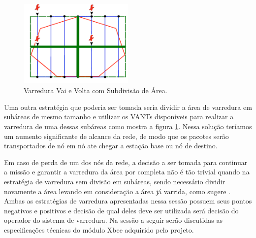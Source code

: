 \begin{figure} 
\center
\includegraphics[width=0.5\textwidth]{comsubdivisao.png}
\caption{Varredura Vai e Volta com Subdivisão de Área.} 
\label{fig:comsubdivisao}
\end{figure}

Uma outra estratégia que poderia ser tomada seria dividir a área de varredura em subáreas de mesmo tamanho e utilizar os VANTs disponíveis para realizar a varredura de uma dessas subáreas como mostra a figura \ref{fig:comsubdivisao}. Nessa solução teríamos um aumento significante de alcance da rede, de modo que os pacotes serão transportados de nó em nó ate chegar a estação base ou nó de destino.

Em caso de perda de um dos nós da rede, a decisão a ser tomada para continuar a missão e garantir a varredura da área por completa não é tão trivial quando na estratégia de varredura sem divisão em subáreas, sendo necessário dividir novamente a área levando em consideração a área já varrida, como sugere \cite{marro2013path}.\\

Ambas as estratégias de varredura apresentadas nessa sessão possuem seus pontos negativos e positivos e decisão de qual deles deve ser utilizada será decisão do operador do sistema de varredura. Na sessão a seguir serão discutidas as especificações técnicas do módulo Xbee adquirido pelo projeto.





